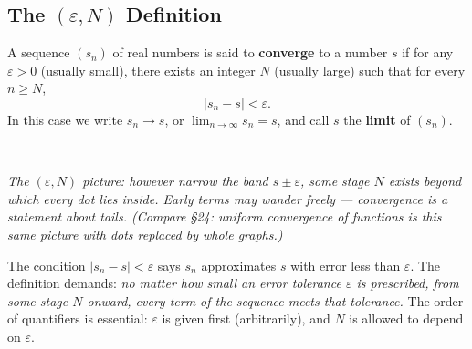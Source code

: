 \documentclass[11pt]{report}
\newcommand{\figcap}[1]{\\[1.5mm]\parbox{0.92\textwidth}{\small\itshape #1}}
\begin{document}
\subsection{The $(\varepsilon, N)$ Definition}

\begin{defbox}
A sequence $(s_n)$ of real numbers is said to \textbf{converge} to a number $s$ if for any $\varepsilon > 0$ (usually small), there exists an integer $N$ (usually large) such that for every $n \geq N$,
\[
|s_n - s| < \varepsilon.
\]
In this case we write $s_n \to s$, or $\displaystyle\lim_{n \to \infty} s_n = s$, and call $s$ the \textbf{limit} of $(s_n)$.
\end{defbox}

\begin{center}
\figcap{The $(\varepsilon, N)$ picture: however narrow the band $s \pm \varepsilon$, some stage $N$ exists beyond which every dot lies inside. Early terms may wander freely --- convergence is a statement about tails. (Compare \S 24: uniform convergence of functions is this same picture with dots replaced by whole graphs.)}
\end{center}


\begin{rembox}
The condition $|s_n - s| < \varepsilon$ says $s_n$ approximates $s$ with error less than $\varepsilon$. The definition demands: \emph{no matter how small an error tolerance $\varepsilon$ is prescribed, from some stage $N$ onward, every term of the sequence meets that tolerance.} The order of quantifiers is essential: $\varepsilon$ is given first (arbitrarily), and $N$ is allowed to depend on $\varepsilon$.
\end{rembox}
\end{document}
